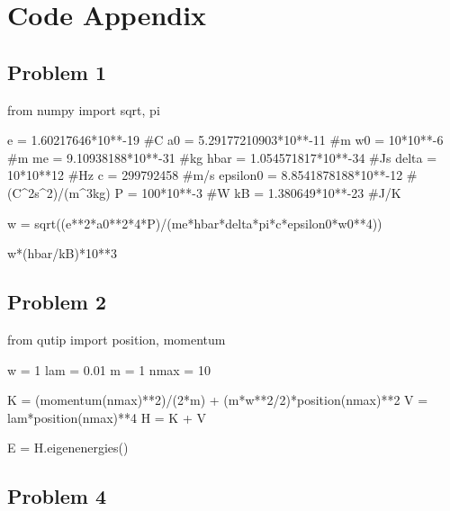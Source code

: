 \section*{Code Appendix}
\subsection*{Problem 1}
\begin{python}
from numpy import sqrt, pi

e = 1.60217646*10**-19 #C
a0 = 5.29177210903*10**-11 #m
w0 = 10*10**-6 #m
me = 9.10938188*10**-31 #kg
hbar = 1.054571817*10**-34 #Js
delta = 10*10**12 #Hz
c = 299792458 #m/s
epsilon0 = 8.8541878188*10**-12 #(C^2s^2)/(m^3kg)
P = 100*10**-3 #W
kB = 1.380649*10**-23 #J/K

w = sqrt((e**2*a0**2*4*P)/(me*hbar*delta*pi*c*epsilon0*w0**4))

w*(hbar/kB)*10**3

\end{python}
\subsection*{Problem 2}
\begin{python}
from qutip import position, momentum

w = 1
lam = 0.01
m = 1
nmax = 10

K = (momentum(nmax)**2)/(2*m) + (m*w**2/2)*position(nmax)**2
V = lam*position(nmax)**4
H = K + V

E = H.eigenenergies()
\end{python}
\subsection*{Problem 4}

